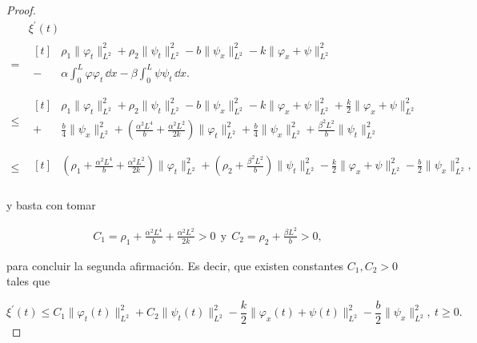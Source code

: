 \begin{proof}
    \begin{align*}
        &\xi^\prime(t)\\   
        =&\begin{aligned}[t]
            &\rho_1\lVert \varphi_t\rVert^2_{L^2} + \rho_2\lVert \psi_t\rVert^2_{L^2} -b\lVert \psi_x \rVert_{L^2}^2 -k\lVert\varphi_x + \psi\rVert^2_{L^2}\\
            -&\alpha\int_0^L\varphi\varphi_t \, \dd x - \beta\int_0^L\psi\psi_t\, \dd x.\\
        \end{aligned}\\
        \leq&\begin{aligned}[t]
            &\rho_1\lVert \varphi_t\rVert^2_{L^2} + \rho_2\lVert \psi_t\rVert^2_{L^2} -b\lVert \psi_x \rVert_{L^2}^2 -k\lVert\varphi_x + \psi\rVert^2_{L^2} + \frac{k}{2}\lVert \varphi_x + \psi\rVert^2_{L^2}\\
            +& \frac{b}{4}\lVert \psi_x \rVert^2_{L^2} + \left(\frac{\alpha^2 L^4}{b} + \frac{\alpha^2 L^2}{2k}\right)\lVert\varphi_t\rVert^2_{L^2} + \frac{b}{4} \lVert \psi_x\rVert^2_{L^2} + \frac{\beta^2L^2}{b}\lVert \psi_t \rVert^2_{L^2}\\
        \end{aligned}\\
        \leq&\begin{aligned}[t]
            &\left(\rho_1 + \frac{\alpha^2 L^4}{b} + \frac{\alpha^2 L^2}{2k}\right)\lVert \varphi_t\rVert^2_{L^2} + \left(\rho_2 + \frac{\beta^2L^2}{b} \right)\lVert \psi_t\rVert^2_{L^2} - \frac{k}{2}\lVert \varphi_x + \psi\rVert_{L^2}^2 - \frac{b}{2}\lVert \psi_x\rVert_{L^2}^2,\\
        \end{aligned}
    \end{align*}

    y basta con tomar

    \begin{align}
        \label{C1yC2}
        C_1 = \rho_1 + \frac{\alpha^2L^4}{b} + \frac{\alpha^2L^2}{2k} > 0 \ \ \text{y} \ \ C_2 = \rho_2 + \frac{\beta L^2}{b} > 0,
    \end{align}

    para concluir la segunda afirmación. Es decir, que existen constantes $C_1, C_2 > 0$ tales que

    \[\xi^\prime(t) \leq C_1\lVert \varphi_t(t)\rVert^2_{L^2} + C_2\lVert \psi_t(t)\rVert^2_{L^2} - \frac{k}{2}\lVert \varphi_x(t) + \psi(t)\rVert^2_{L^2} - \frac{b}{2}\lVert \psi_x \rVert_{L^2}^2, \ t \geq 0.\]


\end{proof}
